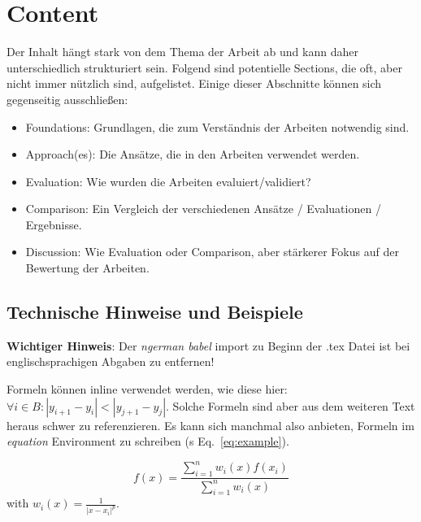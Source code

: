 \documentclass[runningheads,a4paper]{uwsese}
\begin{document}
\section{Content}
\label{seq:content}

Der Inhalt hängt stark von dem Thema der Arbeit ab und kann daher unterschiedlich strukturiert sein. Folgend sind potentielle Sections, die oft, aber nicht immer nützlich sind, aufgelistet. Einige dieser Abschnitte können sich gegenseitig ausschließen:
\begin{itemize}
	\item Foundations: Grundlagen, die zum Verständnis der Arbeiten notwendig sind.
	\item Approach(es): Die Ansätze, die in den Arbeiten verwendet werden.
	\item Evaluation: Wie wurden die Arbeiten evaluiert/validiert?
	\item Comparison: Ein Vergleich der verschiedenen Ansätze / Evaluationen / Ergebnisse.
	\item Discussion: Wie Evaluation oder Comparison, aber stärkerer Fokus auf der Bewertung der Arbeiten.
\end{itemize}

\subsection{Technische Hinweise und Beispiele}

\textbf{Wichtiger Hinweis}: Der \emph{ngerman babel} import zu Beginn der .tex Datei ist bei englischsprachigen Abgaben zu entfernen!

Formeln können inline verwendet werden, wie diese hier: $\forall i \in B : |y_{i+1} - y_i| < |y_{j+1} - y_j|$. Solche Formeln sind aber aus dem weiteren Text heraus schwer zu referenzieren. Es kann sich manchmal also anbieten, Formeln im \emph{equation} Environment zu schreiben (s Eq.~\ref{eq:example}).

\vspace{-6mm}
\begin{center}
	\begin{equation}
	f(x) = \frac{\sum_{i=1}^{n} w_i(x) f(x_i)}{\sum_{i=1}^{n} w_i(x)}
	\label{eq:example}
	\end{equation}
	with $w_i(x) = \frac{1}{|x - x_i|^p}$.
\end{center}
\end{document}
